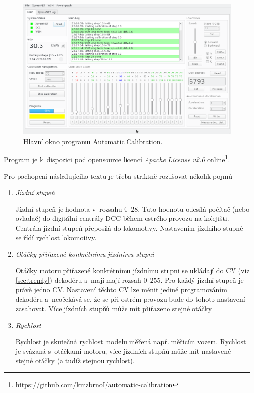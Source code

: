 \begin{figure}[ht]
\includegraphics[width=\textwidth]{data/ac_progress.png}
\caption{Hlavní okno programu Automatic Calibration.}
\label{fig:ac-gui}
\end{figure}

Program je k~dispozici pod opensource licencí \textit{Apache License v2.0}
online\footnote{\url{https://github.com/kmzbrnoI/automatic-calibration}}.

Pro pochopení následujícího textu je třeba striktně rozlišovat několik pojmů:

\begin{enumerate}
\item \textit{Jízdní stupeň}

Jízdní stupeň je hodnota v~rozsahu $0$--$28$. Tuto hodnotu odesílá počítač
(nebo ovladač) do digitální centrály \gls{DCC} během ostrého provozu na kolejišti.
Centrála jízdní stupeň přeposílá do lokomotivy. Nastavením jízdního stupně
se řídí rychlost lokomotivy.

\item \textit{Otáčky přiřazené konkrétnímu jízdnímu stupni}

Otáčky motoru přiřazené konkrétnímu jízdnímu stupni se ukládají do \gls{CV} (viz
\ref{sec:trendy}) dekodéru a~mají mají rozsah $0$--$255$. Pro každý jízdní
stupeň je právě jedno \gls{CV}. Nastavení těchto \gls{CV} lze měnit jedině programováním
dekodéru a~neočekává se, že se při ostrém provozu bude do tohoto nastavení
zasahovat. Více jízdních stupňů může mít přiřazeno stejné otáčky.

\item \textit{Rychlost}

Rychlost je skutečná rychlost modelu měřená např. měřicím vozem. Rychlost
je svázaná s~otáčkami motoru, více jízdních stupňů může mít nastavené
stejné otáčky (a tudíž stejnou rychlost).

\end{enumerate}

